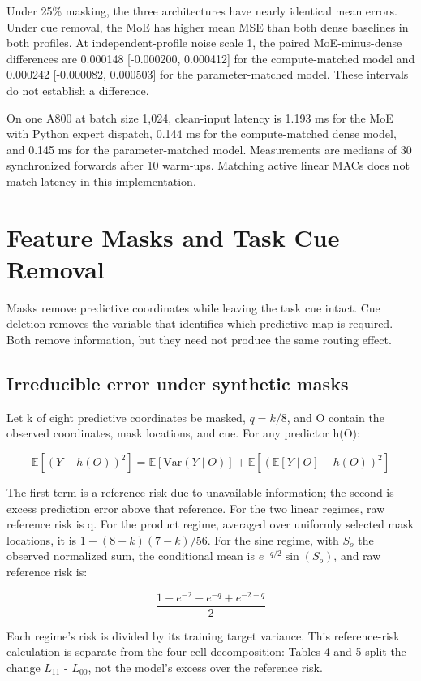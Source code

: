 \documentclass[10pt,letterpaper]{article}
\begin{document}
Under 25\% masking, the three architectures have nearly identical mean errors. Under cue removal, the MoE has higher mean MSE than both dense baselines in both profiles. At independent-profile noise scale 1, the paired MoE-minus-dense differences are 0.000148 [-0.000200, 0.000412] for the compute-matched model and 0.000242 [-0.000082, 0.000503] for the parameter-matched model. These intervals do not establish a difference.


On one A800 at batch size 1,024, clean-input latency is 1.193 ms for the MoE with Python expert dispatch, 0.144 ms for the compute-matched dense model, and 0.145 ms for the parameter-matched model. Measurements are medians of 30 synchronized forwards after 10 warm-ups. Matching active linear MACs does not match latency in this implementation.


\FloatBarrier

\section{Feature Masks and Task Cue Removal}

Masks remove predictive coordinates while leaving the task cue intact. Cue deletion removes the variable that identifies which predictive map is required. Both remove information, but they need not produce the same routing effect.


\subsection{Irreducible error under synthetic masks}

Let k of eight predictive coordinates be masked, $q=k/8$, and O contain the observed coordinates, mask locations, and cue. For any predictor h(O):


\[
\mathbb{E}[(Y-h(O))^2]=\mathbb{E}[\mathrm{Var}(Y\mid O)]+\mathbb{E}[(\mathbb{E}[Y\mid O]-h(O))^2]
\]

The first term is a reference risk due to unavailable information; the second is excess prediction error above that reference. For the two linear regimes, raw reference risk is q. For the product regime, averaged over uniformly selected mask locations, it is $1-(8-k)(7-k)/56$. For the sine regime, with $S_{o}$ the observed normalized sum, the conditional mean is $e^{-q/2}\sin(S_o)$, and raw reference risk is:


\[
\frac{1-e^{-2}-e^{-q}+e^{-2+q}}{2}
\]

Each regime's risk is divided by its training target variance. This reference-risk calculation is separate from the four-cell decomposition: Tables 4 and 5 split the change $L_{11}$ - $L_{00}$, not the model's excess over the reference risk.
\end{document}
